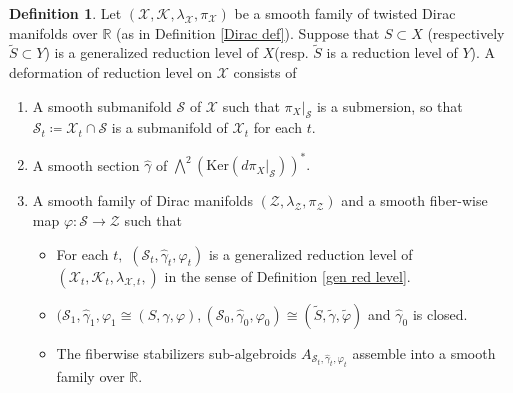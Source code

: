 \documentclass[reqno]{amsart}
\theoremstyle{plain}
\theoremstyle{definition}
\newtheorem{Def}[Thm]{Definition}
\newcommand{\R}{\mathbb{R}}
\newcommand{\too}{\longrightarrow}
\renewcommand{\S}{\mathcal{S}}
\newcommand{\Z}{\mathcal{Z}}
\newcommand{\X}{\mathcal{X}}
\newcommand{\Ker}{\text{Ker}}
\newcommand{\K}{\mathcal{K}}
\begin{document}
\begin{Def} \label{defo level}
Let $(\X,\K,\lambda_\X, \pi_{\X})$ be a smooth family of twisted Dirac manifolds over $\R$ (as in Definition \ref{Dirac def}). Suppose that $S \subset X$ (respectively $\tilde{S} \subset Y$) is a generalized reduction level of $X$(resp. $\tilde{S}$ is a reduction level of $Y$). A deformation of reduction level on $\X$ consists of \begin{enumerate}
    \item A smooth submanifold $\S$ of $\X$ such that $\pi_{X}|_\S$ is a submersion, so that $\S_t \coloneqq \X_t \cap \S$ is a submanifold of $\X_t$ for each $t.$
    \item A smooth section $\widehat{\gamma}$ of $\bigwedge^{2}(\Ker(d\pi_{X}|_\S))^{*}.$
    \item A smooth family of Dirac manifolds $(\Z,\lambda_\Z,\pi_{\Z})$ and a smooth fiber-wise map $\varphi: \S \too \Z$ such that \begin{itemize}
        \item For each $t,$ $(\S_t,\widehat{\gamma}_t,\varphi_t)$ is a generalized reduction level of $(\X_t,\K_t,\lambda_{\X,t},)$ in the sense of Definition \ref{gen red level}.
        \item $(\S_1,\widehat{\gamma}_1,\varphi_1 \cong (S,\gamma,\varphi), (\S_0,\widehat{\gamma}_0,\varphi_0) \cong (\tilde{S},\tilde{\gamma},\tilde{\varphi})$ and $\widehat{\gamma}_0$ is closed.
        \item The fiberwise stabilizers sub-algebroids $A_{\S_t,\widehat{\gamma}_t,\varphi_t}$ assemble into a smooth family over $\R.$
    \end{itemize}
\end{enumerate}
\end{Def}
\end{document}
